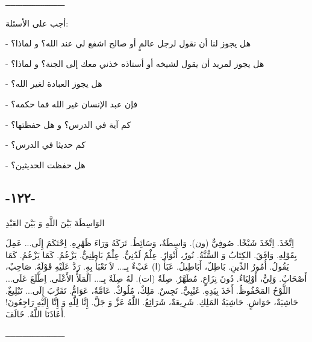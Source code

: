 \documentclass[a5paper]{article}
\begin{document}
ــــــــــــــــــــــــ

أجب على الأسئلة:

- هل يجوز لنا أن نقول لرجل عالمٍ أو صالح اشفع لي عند الله؟ و لماذا؟

- هل يجوز لمريد أن يقول لشيخه أو أستاذه خذني معك إلى الجنة؟ و لماذا؟

- هل يجوز العبادة لغير الله؟

- فإن عبد الإنسان غير الله فما حكمه؟

- كم آية في الدرس؟ و هل حفظتها؟

- كم حديثا في الدرس؟

- هل حفظت الحديثين؟

\subsection[-١٢٢-]{-١٢٢-}
الوَاسِطَةَ بَيْنَ اللَّهِ وَ بَيْنَ العَبْدِ

اِتَّخَذَ. اِتَّخَذَ شَيْخًا. صُوفِيٌّ (ون). وَاسِطَةٌ، وَسَائِطُ. تَرَكَهُ وَرَاءَ ظَهْرِهِ. اِحْتَكَمَ إِلَى... عَمِلَ بِقَوْلِهِ. وَافَقَ. الكِتَابُ وَ السُّنَّةُ. نُورٌ، أَنْوَارٌ. عِلْمٌ لَدُنِيٌّ. عِلْمٌ بَاطِنِيٌّ. يَزْعُمُ. كَمَا يَزْعُمُ. كَمَا يَقُولُ. أُمُورُ الدِّينِ. بَاطِلٌ، أَبَاطِيلُ. عَبَأَ (ا) عَبْءٌ بِـ... لاَ نَعْبَأُ بِهِ. رَدَّ عَلَيْهِ قَوْلَهُ. صَاحِبٌ، أَصْحَابٌ. وَلِيٌّ، أَوْلِيَاءُ. دُونَ نِزَاعٍ. مُطَهَّرٌ. صِلَةٌ (ات). لَهُ صِلَةٌ بِـ... اَلْمَلَأُ الأَعْلَى. اِطَّلَعَ عَلَى... اللَّوْحُ المَحْفُوظُ. أَخَذَ بِيَدِهِ. غَيْبِيٌّ. نَجِسٌ. مَلِكٌ، مُلُوكٌ. عَامَّةٌ، عَوَامُّ. تَقَرَّبَ إِلَى... تَبْلِيغٌ. حَاشِيَةٌ، حَوَاشٍ. حَاشِيَةُ المَلِكِ. شَرِيعَةٌ، شَرَائِعُ. اللَّهُ عَزَّ وَ جَلَّ. إِنَّا لِلَّهِ وَ إِنَّا إِلَيْهِ رَاجِعُونَ! أَعَاذَنَا اللَّهُ. خَالَفَ.

ــــــــــــــــــــــــ
\end{document}
